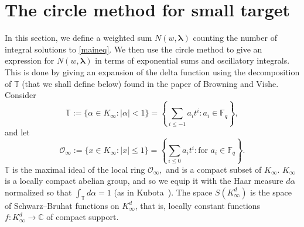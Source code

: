 \documentclass[10pt]{amsart}
\theoremstyle{plain}
\theoremstyle{plain}
\theoremstyle{remark}
\theoremstyle{definition}
\newcommand{\Ki}{K_\infty}
\newcommand{\FF}{\mathbb{F}}
\newcommand{\TT}{\mathbb{T}}
\begin{document}
\section{The circle method for small target}\label{deltamethod}
In this section, we define a weighted sum $N(w, \boldsymbol{\lambda})$  counting the number of integral solutions to \eqref{maineq}. We then use the circle  method to give an expression for $N(w, \boldsymbol{\lambda})$  in terms of exponential sums and oscillatory integrals. This is done by giving an expansion of the delta function using the decomposition of $\TT$ (that we shall define below) found in the paper \cite{Browning} of Browning and Vishe. 
\\

Consider  
$$
\TT:=\{\alpha\in K_\infty: |\alpha|<1\}=\left\{\sum_{i\leq -1}a_it^i: \mbox{$a_i\in \FF_q$}
\right\},
$$
and let
$$\mathcal{O}_{\infty}:=\{x\in\Ki:|x|\leq 1\}=\left\{\sum_{i\leq 0}a_it^i: \mbox{for $a_i\in \FF_q$} \right\}.$$
$\TT$  is the maximal ideal of the local ring $\mathcal{O}_{\infty},$ and  is a compact subset of $K_\infty.$ $\Ki$ is a locally compact abelian group, and so we equip it with the Haar measure $d\alpha$ normalized so that $\int_{\TT}d\alpha=1$ (as in Kubota~\cite[p.9]{kubota}). The space $S(\Ki^d)$ is the space of Schwarz--Bruhat functions on $\Ki^d$, that is, locally constant functions $f:\Ki^d\rightarrow\mathbb{C}$ of compact support.
\end{document}
